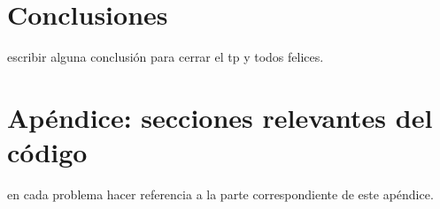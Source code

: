 \documentclass[a4paper]{article}
\begin{document}
\newpage

\section{Conclusiones}
    escribir alguna conclusión para cerrar el tp y todos felices.

\newpage

\section{Apéndice: secciones relevantes del código}
    en cada problema hacer referencia a la parte correspondiente de este apéndice.
\end{document}
